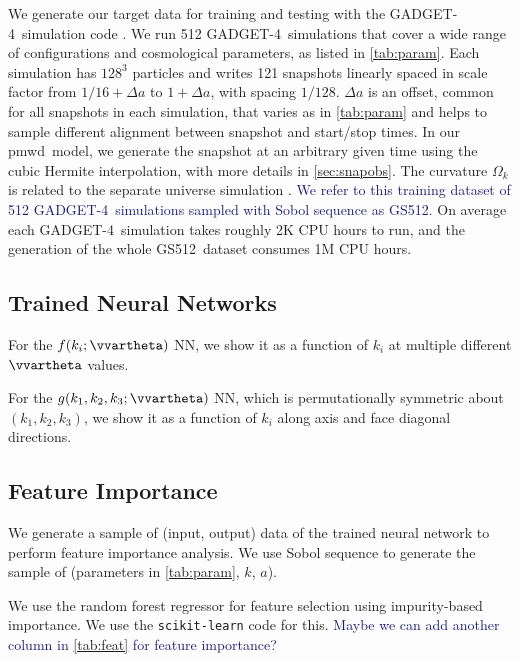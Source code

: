 \documentclass[modern, trackchanges, dvipsnames]{aastex631}
\newcommand{\pmwd}{{\usefont{T1}{nova}{m}{sl}pmwd}}
\newcommand{\GADGET}{{{\fontsize{10pt}{12pt}\selectfont GADGET}-4}}
\newcommand{\GSDATA}{{GS512}}
\newcommand{\YZ}[1]{\textcolor{MidnightBlue}{#1}}
\begin{document}
We generate our target data for training and testing with the \GADGET\
simulation code \citep{GADGET-4}.
We run 512 \GADGET\ simulations that cover a wide range of
configurations and cosmological parameters, as listed in
\autoref{tab:param}.
Each simulation has $128^3$ particles and writes 121 snapshots linearly
spaced in scale factor from $1/16 + \Delta a$ to $1 + \Delta a$, with
spacing $1/128$.
$\Delta a$ is an offset, common for all snapshots in each simulation,
that varies as in \autoref{tab:param} and helps to sample different
alignment between snapshot and start/stop times.
In our \pmwd\ model, we generate the snapshot at an arbitrary given time using
the cubic Hermite interpolation, with more details in \autoref{sec:snapobs}.
The curvature $\Omega_k$ is related to the separate universe simulation
\citep{LiEtAl2014, WagnerEtAl2015}.
\YZ{We refer to this training dataset of 512 \GADGET\ simulations sampled with
Sobol sequence as \GSDATA.}
On average each \GADGET\ simulation takes roughly 2K CPU hours to run, and the
generation of the whole \GSDATA\ dataset consumes 1M CPU hours.


\subsection{Trained Neural Networks}

For the $f(k_i; \vvartheta)$ NN, we show it as a function of $k_i$ at multiple
different $\vvartheta$ values.

For the $g(k_1,k_2,k_3;\vvartheta)$ NN, which is permutationally symmetric about
$(k_1, k_2, k_3)$, we show it as a function of $k_i$ along axis and face
diagonal directions.


\subsection{Feature Importance}

We generate a sample of (input, output) data of the trained neural network to
perform feature importance analysis.
We use Sobol sequence to generate the sample of (parameters in
\autoref{tab:param}, $k$, $a$).

We use the random forest regressor for feature selection using impurity-based
importance.
We use the \texttt{scikit-learn} \citep{scikit-learn} code for this.
\YZ{Maybe we can add another column in \autoref{tab:feat} for feature
importance?}
\end{document}
